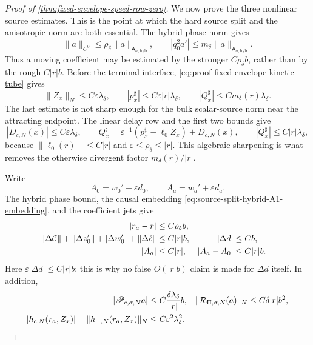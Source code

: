 \begin{proof}[Proof of
\cref{thm:fixed-envelope-speed-row-zero}]
We now prove the three nonlinear source estimates.  This is the point at
which the hard source split and the anisotropic norm are both essential.
The hybrid phase norm gives
\begin{equation}
 \|a\|_{C^0}\le\rho_\delta\|a\|_{\mathsf A_{\sigma,\mathrm{hyb}}},
 \qquad
 |q_0^2a'|\le m_\delta
       \|a\|_{\mathsf A_{\sigma,\mathrm{hyb}}}.   \label{eq:proof-fixed-envelope-phase-scales}
\end{equation}
Thus a moving coefficient may be estimated by the stronger
\(C\rho_\delta b\), rather than by the rough \(C|r|b\).
Before the terminal interface,
\cref{eq:proof-fixed-envelope-kinetic-tube} gives
\begin{equation}
 \|Z_x\|_N\le C\varepsilon\lambda_\delta,\qquad
 |p_x^\sharp|\le C\varepsilon|r|\lambda_\delta,\qquad
 |Q_x^\sharp|\le C m_\delta(r)\lambda_\delta.     \label{eq:proof-fixed-envelope-bulk-state}
\end{equation}
The last estimate is not sharp enough for the bulk scalar-source norm near
the attracting endpoint.  The linear delay row and the first two bounds
give
\begin{equation}
 |D_{c,N}(x)|\le C\varepsilon\lambda_\delta,\qquad
 Q_x^\sharp=\varepsilon^{-1}
       (p_x^\sharp-\ell_0Z_x)+D_{c,N}(x),\qquad
 |Q_x^\sharp|\le C|r|\lambda_\delta,             \label{eq:proof-fixed-envelope-bulk-speed-sharpening}
\end{equation}
because \(\|\ell_0(r)\|\le C|r|\) and
\(\varepsilon\le\rho_\delta\le|r|\).  This algebraic sharpening is what
removes the otherwise divergent factor \(m_\delta(r)/|r|\).

Write
\[
 A_0=w_0'+\varepsilon d_0,\qquad
 A_a=w_a'+\varepsilon d_a.
\]
The hybrid phase bound, the causal embedding
\cref{eq:source-split-hybrid-A1-embedding}, and the coefficient jets give
\begin{align}
 |r_a-r|&\le C\rho_\delta b,\notag\\
 \|\Delta\mathcal C\|+\|\Delta z_0'\|
   +|\Delta w_0'|+\|\Delta\ell\|&\le C|r|b,
 &|\Delta d|&\le Cb,\notag\\
 |A_a|&\le C|r|,& |A_a-A_0|&\le C|r|b.           \label{eq:proof-fixed-envelope-bulk-coefficient-ledger}
\end{align}
Here \(\varepsilon|\Delta d|\le C|r|b\); this is why no false
\(O(|r|b)\) claim is made for \(\Delta d\) itself.  In addition,
\begin{align}
 |\mathscr P_{c,\sigma,N}a|&\le
        C\frac{\delta\lambda_\delta}{|r|}b,
 &\|\mathcal R_{\Pi,\sigma,N}(a)\|_N
      &\le C\delta|r|b^2,\notag\\
 |h_{c,N}(r_a,Z_x)|+
   \|h_{\perp,N}(r_a,Z_x)\|_N
      &\le C\varepsilon^2\lambda_\delta^2.       \label{eq:proof-fixed-envelope-bulk-auxiliary-ledger}
\end{align}


\end{proof}
